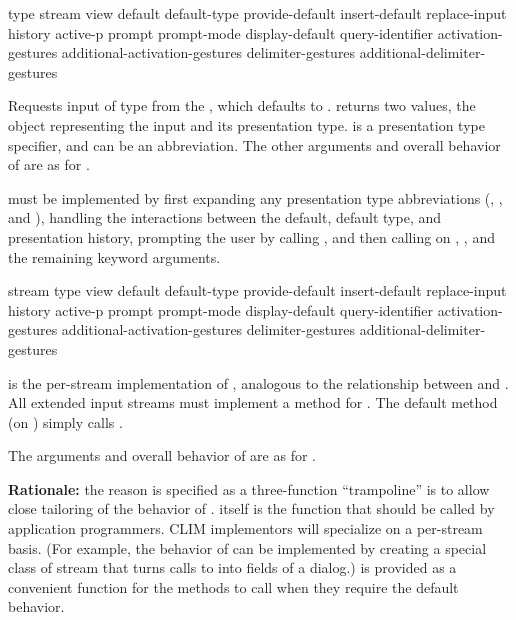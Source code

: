  {type
                 \key stream view
                      default default-type provide-default 
                      insert-default replace-input history active-p
                      prompt prompt-mode display-default query-identifier
                      activation-gestures additional-activation-gestures
                      delimiter-gestures additional-delimiter-gestures}

Requests input of type  from the  , which
defaults to .   returns two values, the object
representing the input and its presentation type.   is a presentation
type specifier, and can be an abbreviation.  The other arguments and overall
behavior of  are as for .

 must be implemented by first expanding any presentation type
abbreviations (, , and ), handling the
interactions between the default, default type, and presentation history,
prompting the user by calling , and then calling
 on , , and the remaining keyword
arguments.

 {stream type
                             \key view 
                                  default default-type provide-default 
                                  insert-default replace-input history active-p
                                  prompt prompt-mode display-default query-identifier
                                  activation-gestures additional-activation-gestures
                                  delimiter-gestures additional-delimiter-gestures}

 is the per-stream implementation of , analogous to
the relationship between  and .  All extended
input streams must implement a method for .  The default
method (on ) simply calls .

The arguments and overall behavior of  are as for .

{\bf Rationale:} the reason  is specified as a three-function
``trampoline'' is to allow close tailoring of the behavior of .
 itself is the function that should be called by application
programmers.  CLIM implementors will specialize  on a
per-stream basis.  (For example, the behavior of  can be
implemented by creating a special class of stream that turns calls to
 into fields of a dialog.)   is provided as a
convenient function for the  methods to call when they require
the default behavior.

